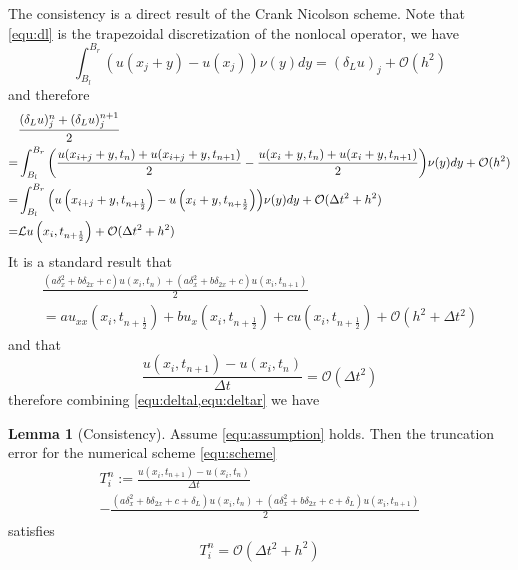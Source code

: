 \documentclass[3p,,preprint,12pt]{elsarticle}
\theoremstyle{definition}
\newtheorem{lemma}{Lemma}
\begin{document}
The consistency is a direct result of the Crank Nicolson scheme. Note that \cref{equ:dl} is the trapezoidal discretization of the nonlocal operator, we have
\begin{equation}
	\int_{B_l}^{B_r} (u(x_j+y)-u(x_j))\nu(y)dy = (\delta_L u)_j + \mathcal{O}(h^2)
\end{equation}
and therefore
\begin{equation}\label{equ:deltal}
  \begin{aligned}
	&\frac{{({\delta _L}u)_j^n + ({\delta _L}u)_j^{n + 1}}}{2} \\
	=& \int_{{B_l}}^{{B_r}} {\left( {\frac{{u({x_{i + j}} + y,{t_n}) + u({x_{i + j}} + y,{t_{n + 1}})}}{2} - \frac{{u({x_i} + y,{t_n}) + u({x_i} + y,{t_{n + 1}})}}{2}} \right)} \nu (y)dy + \mathcal{O}( {h^2})\\
	 =& \int_{{B_l}}^{{B_r}} {\left( {u\left( {{x_{i + j}} + y,{t_{n + \frac{1}{2}}}} \right) - u\left( {{x_i} + y,{t_{n + \frac{1}{2}}}} \right)} \right)} \nu (y)dy + \mathcal{O}(\Delta {t^2} + {h^2})\\
	  =& {\cal L}u\left( {{x_i},{t_{n + \frac{1}{2}}}} \right) + \mathcal{O}(\Delta {t^2} + {h^2})
\end{aligned}
\end{equation}
It is a standard result that~\cite{giles2005convergence}
\begin{multline}\label{equ:deltar}
	\frac{{(a\delta _x^2 + b{\delta _{2x}} + c)u(x_i,t_n) + (a\delta _x^2 + b{\delta _{2x}} + c)u(x_i,t_{n+1})}}{2} \\= a{u_{xx}}\left( {{x_i},{t_{n + \frac{1}{2}}}} \right) + b{u_x}\left( {{x_i},{t_{n + \frac{1}{2}}}} \right) + cu\left( {{x_i},{t_{n + \frac{1}{2}}}} \right)+\mathcal{O}(h^2+\Delta t^2)
\end{multline}
and that
\[\frac{{u({x_i},{t_{n + 1}}) - u({x_i},{t_n})}}{{\Delta t}} = \mathcal{O}(\Delta t^2)\]
therefore combining \cref{equ:deltal,equ:deltar} we have
\begin{lemma}[Consistency]\label{lemma:consistency}
	Assume \cref{equ:assumption} holds. Then the truncation error for the numerical scheme \cref{equ:scheme}  
	\begin{multline}
		T^n_i := \frac{{u({x_i},{t_{n + 1}}) - u({x_i},{t_n})}}{{\Delta t}}\\
		 - \frac{{(a\delta _x^2 + b{\delta _{2x}} + c + {\delta _L})u({x_i},{t_n}) + (a\delta _x^2 + b{\delta _{2x}} + c + {\delta _L})u({x_i},{t_{n + 1}})}}{2}
	\end{multline}
	satisfies
	\begin{equation}
		T^n_i = \mathcal{O}(\Delta t^2 + h^2)
	\end{equation}
	
\end{lemma}
\end{document}
